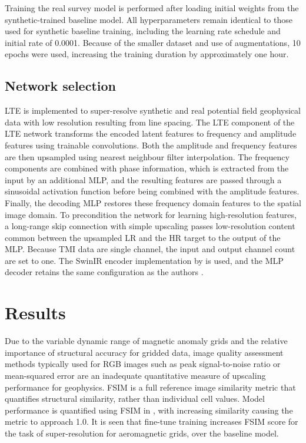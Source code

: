 Training the real survey model is performed after loading initial weights from the synthetic-trained baseline model.
All hyperparameters remain identical to those used for synthetic baseline training, including the learning rate schedule and initial rate of \num{0.0001}.
Because of the smaller dataset and use of augmentations, \num{10} epochs were used, increasing the training duration by approximately one hour.


\subsection{Network selection}
\label{sec:2lte}
LTE \parencite{leeLocalTextureEstimator2022} is implemented to super-resolve synthetic and real potential field geophysical data with low resolution resulting from line spacing.
The LTE component of the LTE network transforms the encoded latent features to frequency and amplitude features using trainable convolutions.
Both the amplitude and frequency features are then upsampled using nearest neighbour filter interpolation.
The frequency components are combined with phase information, which is extracted from the input by an additional MLP, and the resulting features are passed through a sinusoidal activation function before being combined with the amplitude features.
Finally, the decoding MLP restores these frequency domain features to the spatial image domain.
To precondition the network for learning high-resolution features, a long-range skip connection with simple upscaling passes low-resolution content common between the upsampled LR and the HR target to the output of the MLP\@.
Because TMI data are single channel, the input and output channel count are set to one.
The SwinIR encoder implementation by is used, and the MLP decoder retains the same configuration as the authors \parencite{leeLocalTextureEstimator2022}.

\section{Results}
\label{sec:2results}
Due to the variable dynamic range of magnetic anomaly grids and the relative importance of structural accuracy for gridded data, image quality assessment methods typically used for RGB images such as peak signal-to-noise ratio or mean-squared error are an inadequate quantitative measure of upscaling performance for geophysics.
FSIM \parencite{linzhangFSIMFeatureSimilarity2011} is a full reference image similarity metric that quantifies structural similarity, rather than individual cell values.
Model performance is quantified using FSIM in , with increasing similarity causing the metric to approach 1.0.
It is seen that fine-tune training increases FSIM score for the task of super-resolution for aeromagnetic grids, over the baseline model.

